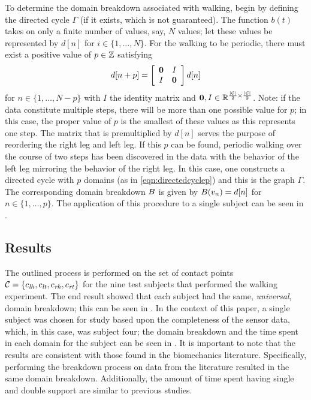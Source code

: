 To determine the domain breakdown associated with walking, begin by defining the directed cycle $\Gamma$ (if it exists, which is not guaranteed). The function $b(t)$ takes on only a finite number of values, say, $N$ values; let these values be represented by $d[n]$ for $i \in \{1, \ldots, N\}$. For the walking to be periodic, there must exist a positive value of $p \in \mathbb{Z}$ satisfying
\begin{align}
  \label{eq:dstep}
  d[n + p] =
  \left[\begin{array}{c c}
      {\mathbf 0} & I\\
      I & {\mathbf 0}
    \end{array}\right] d[n]
\end{align}
for $n \in \{1, \ldots, N-p\}$ with $I$ the identity matrix and ${\mathbf 0}, I \in \mathbb{R}^{\frac{|\mathcal{C}|}{2} \times \frac{|\mathcal{C}|}{2}}$. Note: if the data constitute multiple steps, there will be more than one possible value for $p$; in this case, the proper value of $p$ is the smallest of these values as this represents one step. The matrix that is premultiplied by $d[n]$ serves the purpose of reordering the right leg and left leg.  If this $p$ can be found, periodic walking over the course of two steps has been discovered in the data with the behavior of the left leg mirroring the behavior of the right leg. In this case, one constructs a directed cycle with $p$ domains (as in \eqref{eqn:directedcyclep}) and this is the graph $\Gamma$. The corresponding domain breakdown $B$ is given by $B(v_{n}) = d[n]$ for $n \in \{1, \ldots, p\}$. The application of this procedure to a single subject can be seen in .

\subsection{Results} The outlined process is performed on the set of contact points $\mathcal{C} =  \{c_{\mathit{lh}}, c_{\mathit{lt}}, c_{\mathit{rh}} , c_{\mathit{rt}}\}$ for the nine test subjects that performed the walking experiment. The end result showed that each subject had the same, {\em universal}, domain breakdown; this can be seen in . In the context of this paper, a single subject was chosen for study based upon the completeness of the sensor data, which, in this case, was subject four; the domain breakdown and the time spent in each domain for the subject can be seen in . It is important to note that the results are consistent with those found in the biomechanics literature. Specifically, performing the breakdown process on data from the literature\cite{Winter90} resulted in the same domain breakdown. Additionally, the amount of time spent having single and double support are similar to previous studies.\cite{Ackermann07}

